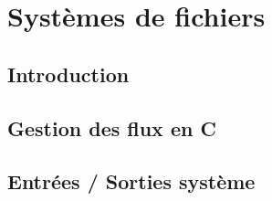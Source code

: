 \section{Systèmes de fichiers}

	\subsection{Introduction}
	
	\subsection{Gestion des flux en C}
	
	\subsection{Entrées / Sorties système}